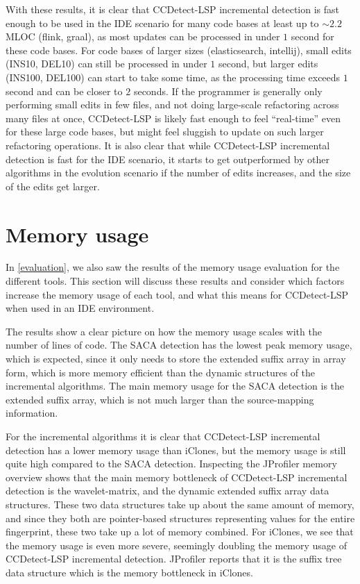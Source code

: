 With these results, it is clear that CCDetect-LSP incremental detection is fast enough to
be used in the IDE scenario for many code bases at least up to ${\sim}2.2$MLOC (flink,
graal), as most updates can be processed in under $1$ second for these code bases. For
code bases of larger sizes (elasticsearch, intellij), small edits (INS10, DEL10) can still
be processed in under $1$ second, but larger edits (INS100, DEL100) can start to take some
time, as the processing time exceeds $1$ second and can be closer to $2$ seconds. If the
programmer is generally only performing small edits in few files, and not doing
large-scale refactoring across many files at once, CCDetect-LSP is likely fast enough to
feel ``real-time'' even for these large code bases, but might feel sluggish to update on
such larger refactoring operations. It is also clear that while CCDetect-LSP incremental
detection is fast for the IDE scenario, it starts to get outperformed by other algorithms
in the evolution scenario if the number of edits increases, and the size of the edits get
larger.

\section{Memory usage}

In \cref{evaluation}, we also saw the results of the memory usage evaluation for the
different tools. This section will discuss these results and consider which factors
increase the memory usage of each tool, and what this means for CCDetect-LSP when used in
an IDE environment.

The results show a clear picture on how the memory usage scales with the number of lines
of code. The SACA detection has the lowest peak memory usage, which is expected, since it
only needs to store the extended suffix array in array form, which is more memory
efficient than the dynamic structures of the incremental algorithms. The main memory usage
for the SACA detection is the extended suffix array, which is not much larger than the
source-mapping information.

For the incremental algorithms it is clear that CCDetect-LSP incremental detection has a
lower memory usage than iClones, but the memory usage is still quite high compared to the
SACA detection. Inspecting the JProfiler memory overview shows that the main memory
bottleneck of CCDetect-LSP incremental detection is the wavelet-matrix, and the dynamic
extended suffix array data structures. These two data structures take up about the same
amount of memory, and since they both are pointer-based structures representing values for
the entire fingerprint, these two take up a lot of memory combined. For iClones, we see
that the memory usage is even more severe, seemingly doubling the memory usage of
CCDetect-LSP incremental detection. JProfiler reports that it is the suffix tree data
structure which is the memory bottleneck in iClones. 

